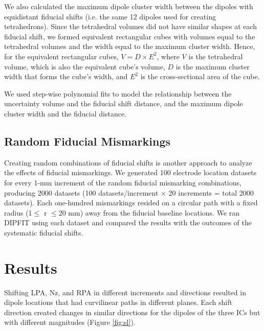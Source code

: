 \documentclass{UCF_ETD}
\begin{document}
We also calculated the maximum dipole cluster width between the dipoles with equidistant fiducial shifts (i.e. the same 12 dipoles used for creating tetrahedrons). Since the tetrahedral volumes did not have similar shapes at each fiducial shift, we formed equivalent rectangular cubes with volumes equal to the tetrahedral volumes and the width equal to the maximum cluster width. Hence, for the equivalent rectangular cubes, $V = D \times E^2$, where $V$ is the tetrahedral volume, which is also the equivalent cube's volume, $D$ is the maximum cluster width that forms the cube's width, and $E^2$ is the cross-sectional area of the cube.

We used step-wise polynomial fits to model the relationship between the uncertainty volume and the fiducial shift distance, and the maximum dipole cluster width and the fiducial distance.

\subsection{Random Fiducial Mismarkings}
Creating random combinations of fiducial shifts is another approach to analyze the effects of fiducial mismarkings. We generated 100 electrode location datasets for every 1-mm increment of the random fiducial mismarking combinations, producing 2000 datasets (100 datasets/increment $\times$ 20 increments = total 2000 datasets). Each one-hundred mismarkings resided on a circular path with a fixed radius (1$\leq$ r $\leq$20 mm) away from the fiducial baseline locations. We ran DIPFIT using each dataset and compared the results with the outcomes of the systematic fiducial shifts.

\section{Results}

Shifting LPA, Nz, and RPA in different increments and directions resulted in dipole locations that had curvilinear paths in different planes. Each shift direction created changes in similar directions for the dipoles of the three ICs but with different magnitudes (Figure \ref{fig:sl}).
\end{document}
